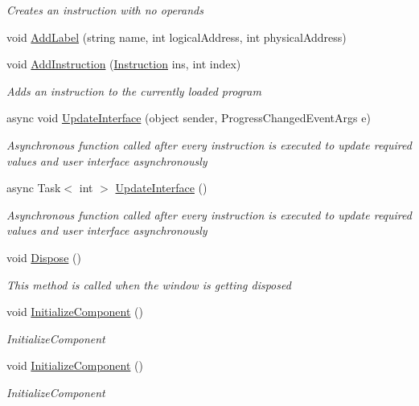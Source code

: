 \begin{DoxyCompactItemize}
\begin{DoxyCompactList}\small\item\em Creates an instruction with no operands \end{DoxyCompactList}\item 
void \hyperlink{class_c_p_u___o_s___simulator_1_1_main_window_aa8c9090daa6385de79a3dec36fbbc42f}{Add\+Label} (string name, int logical\+Address, int physical\+Address)
\item 
void \hyperlink{class_c_p_u___o_s___simulator_1_1_main_window_ae73f56ccee0f45b0df54438b3d397dd9}{Add\+Instruction} (\hyperlink{class_c_p_u___o_s___simulator_1_1_c_p_u_1_1_instruction}{Instruction} ins, int index)
\begin{DoxyCompactList}\small\item\em Adds an instruction to the currently loaded program \end{DoxyCompactList}\item 
async void \hyperlink{class_c_p_u___o_s___simulator_1_1_main_window_a27c9bde14aab0b0a82f5e13e0a71c86c}{Update\+Interface} (object sender, Progress\+Changed\+Event\+Args e)
\begin{DoxyCompactList}\small\item\em Asynchronous function called after every instruction is executed to update required values and user interface asynchronously \end{DoxyCompactList}\item 
async Task$<$ int $>$ \hyperlink{class_c_p_u___o_s___simulator_1_1_main_window_adbb759abbf37061f785e82a9e7f7b3e1}{Update\+Interface} ()
\begin{DoxyCompactList}\small\item\em Asynchronous function called after every instruction is executed to update required values and user interface asynchronously \end{DoxyCompactList}\item 
void \hyperlink{class_c_p_u___o_s___simulator_1_1_main_window_a195e7715af146b207e5b973bd10c80c6}{Dispose} ()
\begin{DoxyCompactList}\small\item\em This method is called when the window is getting disposed \end{DoxyCompactList}\item 
void \hyperlink{class_c_p_u___o_s___simulator_1_1_main_window_a30724af44ae89c2172130c2dd36e145c}{Initialize\+Component} ()
\begin{DoxyCompactList}\small\item\em Initialize\+Component \end{DoxyCompactList}\item 
void \hyperlink{class_c_p_u___o_s___simulator_1_1_main_window_a30724af44ae89c2172130c2dd36e145c}{Initialize\+Component} ()
\begin{DoxyCompactList}\small\item\em Initialize\+Component \end{DoxyCompactList}\end{DoxyCompactItemize}
